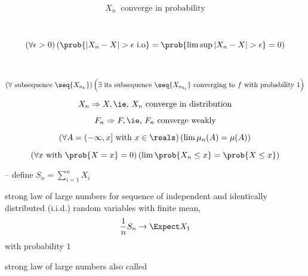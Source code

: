 \documentclass[17pt,landscape]{foils}
\begin{document}
{	$$
		{X_n}\ \mbox{ converge in probability}
	$$

	\iaoi\

	$$
		\left(
			\forall \epsilon>0
		\right)
		\left(
			\prob{|X_n-X|>\epsilon\mbox{ i.o}}
				=
			\prob{\limsup |X_n-X| > \epsilon } = 0
		\right)
	$$

	\iaoi\

	$$
		\left(
			\forall \mbox{ subsequence }\seq{X_{n_k}}
		\right)
		\left(
			\exists \mbox{ its subsequence }\seq{X_{n_{k_l}}} \mbox{ converging to } f \mbox{ with probability } 1
		\right)
	$$



	$$
		X_n\Rightarrow X, \mbox{\ie, $X_n$ converge in distribution}
	$$

		\iaoi

	$$
		F_n\Rightarrow F, \mbox{\ie, $F_n$ converge weakly}
	$$

		\iaoi

	$$
		\left(
			\forall A = (-\infty, x] \mbox{ with } x\in\reals
		\right)
		\left(
			\lim \mu_n(A) = \mu(A)
		\right)
	$$

		\iaoi

	$$
		\left(
			\forall x \mbox{ with } \prob{X=x} = 0
		\right)
		\left(
			\lim \prob{X_n\leq x} = \prob{X\leq x}
		\right)
	$$



-- define $S_n = \sum_{i=1}^n X_i$

\begin{mytheorem}{strong law of large numbers}%
	for sequence of independent and identically distributed (i.i.d.) random variables
	with finite mean, 
	$$
		\frac{1}{n} S_n \to \Expect X_1
	$$
	with probability $1$
\end{mytheorem}

\bit
	\item strong law of large numbers also called %
\eit

}
\end{document}
